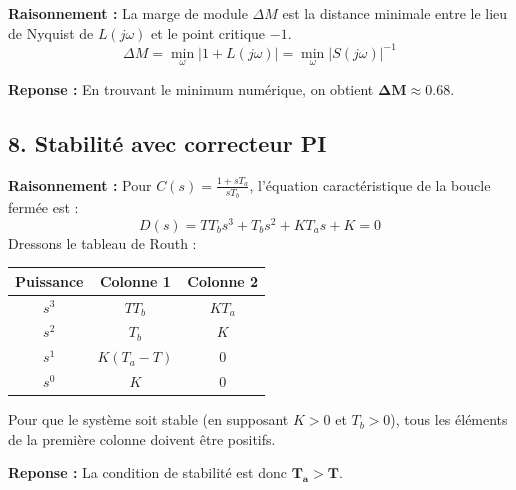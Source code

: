 \documentclass[11pt,a4paper]{article}
\begin{document}
\textbf{Raisonnement :} La marge de module $\Delta M$ est la distance minimale entre le lieu de Nyquist de $L(j\omega)$ et le point critique $-1$.
$$
\Delta M = \min_{\omega} |1 + L(j\omega)| = \min_{\omega} |S(j\omega)|^{-1}
$$

\textbf{Reponse :} En trouvant le minimum numérique, on obtient $\mathbf{\Delta M \approx 0.68}$.

\subsection*{8. Stabilité avec correcteur PI}

\textbf{Raisonnement :} Pour $C(s) = \frac{1+sT_a}{sT_b}$, l'équation caractéristique de la boucle fermée est :
$$ 
D(s) = T T_b s^3 + T_b s^2 + K T_a s + K = 0 
$$
Dressons le tableau de Routh :
\begin{table}[h!]
    \centering
    \begin{tabular}{ccc}
        \toprule
        \textbf{Puissance} & \textbf{Colonne 1} & \textbf{Colonne 2} \\
        \midrule
        $s^3$ & $T T_b$ & $K T_a$ \\
        $s^2$ & $T_b$ & $K$ \\
        $s^1$ & $K(T_a - T)$ & 0 \\
        $s^0$ & $K$ & 0 \\
        \bottomrule
    \end{tabular}
\end{table}
Pour que le système soit stable (en supposant $K>0$ et $T_b>0$), tous les éléments de la première colonne doivent être positifs.

\textbf{Reponse :} La condition de stabilité est donc $\mathbf{T_a > T}$.
\end{document}
